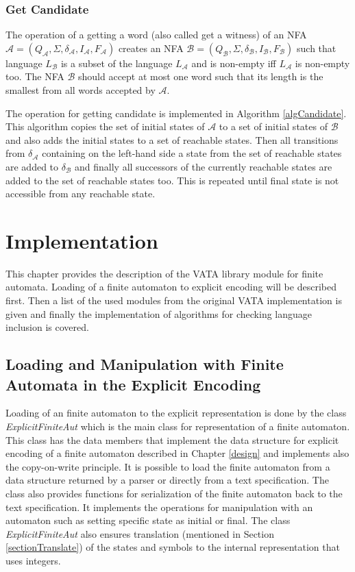\subsection{Get Candidate}
The operation of a getting a word (also called get a witness) of an NFA $\mathcal{A}=(Q_\mathcal{A},\Sigma,\delta_\mathcal{A},I_\mathcal{A},F_\mathcal{A})$ 
creates an NFA $\mathcal{B}=(Q_\mathcal{B},\Sigma,\delta_\mathcal{B},I_\mathcal{B},F_\mathcal{B})$ such that language $L_\mathcal{B}$
is a subset of the language $L_\mathcal{A}$ and is non-empty iff $L_\mathcal{A}$ is non-empty too.
The NFA $\mathcal{B}$ should accept at most one word such that its length is the smallest from all words accepted by $\mathcal{A}$.

The operation for getting candidate is implemented in Algorithm \ref{algCandidate}. This algorithm copies the set of initial states 
of $\mathcal{A}$ to a set of initial states of $\mathcal{B}$ and also adds the initial states to a set of reachable states. 
Then all transitions from $\delta_\mathcal{A}$ containing on the left-hand side a state from the set of reachable states are added to $\delta_\mathcal{B}$ 
and finally
all successors of the currently reachable states are added to the set of reachable states too. 
This is repeated until final state is not accessible from any reachable state. 

\chapter{Implementation}
\label{implementation}
This chapter provides the description of the VATA library module for finite automata. Loading of a finite
automaton to explicit encoding will be described first. 
Then a list of the used modules from the original VATA implementation is given and finally the implementation of algorithms 
for checking language inclusion is covered.

\section{Loading and Manipulation with Finite Automata in the Explicit Encoding}
Loading of an finite automaton to the explicit representation 
is done by  the class \emph{Explicit\-FiniteAut} which is the main class for representation of a finite automaton. 
This class has the data members that implement the data structure for explicit encoding of a finite automaton described in Chapter \ref{design} and
implements also the copy-on-write principle. 
It is possible to load the finite automaton from a data structure returned by a parser or directly from a text specification. 
The class also provides functions for serialization of the finite automaton back to the text specification.
It implements the operations for manipulation with an automaton such as setting specific state as initial or final.
The class \emph{ExplicitFiniteAut} also ensures translation (mentioned in Section \ref{sectionTranslate}) of the states 
and symbols to the internal representation that uses integers. 

